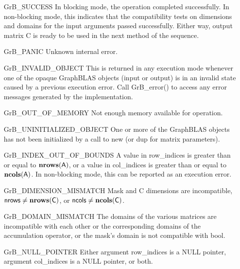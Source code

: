 \begin{itemize}[leftmargin=2.1in]
    \item[{\sf GrB\_SUCCESS}]         In blocking mode, the operation completed
    successfully. In non-blocking mode, this indicates that the compatibility 
    tests on dimensions and domains for the input arguments passed successfully. 
    Either way, output matrix {\sf C} is ready to be used in the next method of 
    the sequence.

    \item[{\sf GrB\_PANIC}]            Unknown internal error.
    
    \item[{\sf GrB\_INVALID\_OBJECT}] This is returned in any execution mode 
    whenever one of the opaque GraphBLAS objects (input or output) is in an invalid 
    state caused by a previous execution error.  Call {\sf GrB\_error()} to access 
    any error messages generated by the implementation.

    \item[{\sf GrB\_OUT\_OF\_MEMORY}]  Not enough memory available for operation.
    
    \item[{\sf GrB\_UNINITIALIZED\_OBJECT}] One or more of the GraphBLAS objects 
    has not been initialized by a call to {\sf new} (or {\sf dup} for matrix
    parameters).

    \item[{\sf GrB\_INDEX\_OUT\_OF\_BOUNDS}]  A value in {\sf row\_indices} 
    is greater than or equal to $\bold{nrows}({\sf A})$, or a value in 
    {\sf col\_indices} is greater than or equal to $\bold{ncols}({\sf A})$.  In 
    non-blocking mode, this can be reported as an execution error.
    
    \item[{\sf GrB\_DIMENSION\_MISMATCH}] {\sf Mask} and {\sf C} dimensions are
    incompatible, ${\sf nrows} \neq \bold{nrows}({\sf C})$, or 
    ${\sf ncols} \neq \bold{ncols}({\sf C})$.

    \item[{\sf GrB\_DOMAIN\_MISMATCH}]     The domains of the various matrices
    are incompatible with each other or the corresponding domains of the 
    accumulation operator, or the mask's domain is not compatible with {\sf bool}.

    \item[{\sf GrB\_NULL\_POINTER}] Either argument {\sf row\_indices} is a {\sf NULL} pointer,
	    argument {\sf col\_indices} is a {\sf NULL} pointer, or both.
\end{itemize}

